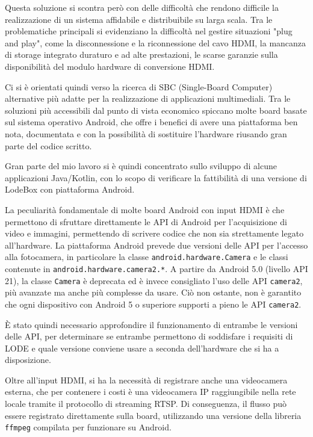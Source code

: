 Questa soluzione si scontra però con delle difficoltà che rendono difficile la realizzazione di un sistema affidabile e distribuibile su larga scala. Tra le problematiche principali si evidenziano la difficoltà nel gestire situazioni "plug and play", come la disconnessione e la riconnessione del cavo HDMI, la mancanza di storage integrato duraturo e ad alte prestazioni, le scarse garanzie sulla disponibilità del modulo hardware di conversione HDMI.

Ci si è orientati quindi verso la ricerca di SBC (Single-Board Computer) alternative più adatte per la realizzazione di applicazioni multimediali. Tra le soluzioni più accessibili dal punto di vista economico spiccano molte board basate sul sistema operativo Android, che offre i benefici di avere una piattaforma ben nota, documentata e con la possibilità di sostituire l'hardware riusando gran parte del codice scritto.

Gran parte del mio lavoro si è quindi concentrato sullo sviluppo di alcune applicazioni Java/Kotlin, con lo scopo di verificare la fattibilità di una versione di LodeBox con piattaforma Android.

La peculiarità fondamentale di molte board Android con input HDMI è che permettono di sfruttare direttamente le API di Android per l'acquisizione di video e immagini, permettendo di scrivere codice che non sia strettamente legato all'hardware. La piattaforma Android prevede due versioni delle API per l'accesso alla fotocamera, in particolare la classe \texttt{android.hardware.Camera} e le classi contenute in \texttt{android.hardware.camera2.*}. A partire da Android 5.0 (livello API 21), la classe \texttt{Camera} è deprecata ed è invece consigliato l'uso delle API \texttt{camera2}, più avanzate ma anche più complesse da usare. Ciò non ostante, non è garantito che ogni dispositivo con Android 5 o superiore supporti a pieno le API \texttt{camera2}.

È stato quindi necessario approfondire il funzionamento di entrambe le versioni delle API, per determinare se entrambe permettono di soddisfare i requisiti di LODE e quale versione conviene usare a seconda dell'hardware che si ha a disposizione.

Oltre all'input HDMI, si ha la necessità di registrare anche una videocamera esterna, che per contenere i costi è una videocamera IP raggiungibile nella rete locale tramite il protocollo di streaming RTSP. Di conseguenza, il flusso può essere registrato direttamente sulla board, utilizzando una versione della libreria \texttt{ffmpeg} compilata per funzionare su Android.


